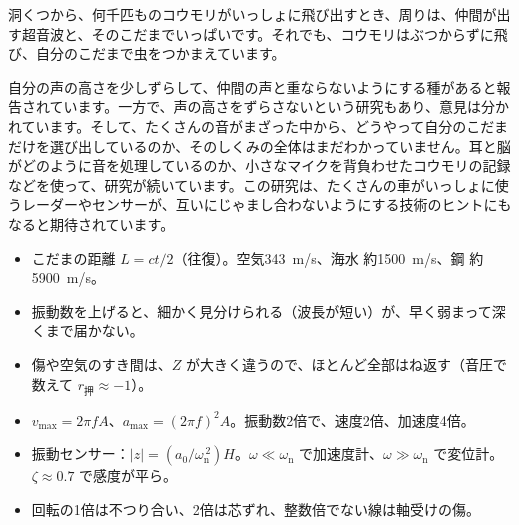 \begin{phmada}
洞くつから、何千匹ものコウモリがいっしょに飛び出すとき、周りは、仲間が出す超音波と、そのこだまでいっぱいです。それでも、コウモリはぶつからずに飛び、自分のこだまで虫をつかまえています。

自分の声の高さを少しずらして、仲間の声と重ならないようにする種があると報告されています。一方で、声の高さをずらさないという研究もあり、意見は分かれています。そして、たくさんの音がまざった中から、どうやって自分のこだまだけを選び出しているのか、そのしくみの全体はまだわかっていません。耳と脳がどのように音を処理しているのか、小さなマイクを背負わせたコウモリの記録などを使って、研究が続いています。この研究は、たくさんの車がいっしょに使うレーダーやセンサーが、互いにじゃまし合わないようにする技術のヒントにもなると期待されています。
\end{phmada}

\begin{taisetsu}
\begin{itemize}[leftmargin=1.2\zw, itemsep=2pt, topsep=0pt, label={\color{bkNavy}●}]
\item こだまの距離 $L=ct/2$（往復）。空気\qty{343}{m/s}、海水 約\qty{1500}{m/s}、鋼 約\qty{5900}{m/s}。
\item 振動数を上げると、細かく見分けられる（波長が短い）が、早く弱まって深くまで届かない。
\item 傷や空気のすき間は、$Z$ が大きく違うので、ほとんど全部はね返す（音圧で数えて $r_{\text{押}}\approx-1$）。
\item $v_{\max}=2\pi fA$、$a_{\max}=(2\pi f)^2A$。振動数2倍で、速度2倍、加速度4倍。
\item 振動センサー：$|z|=(a_0/\omega_{\mathrm n}^{\,2})H$。$\omega\ll\omega_{\mathrm n}$ で加速度計、$\omega\gg\omega_{\mathrm n}$ で変位計。$\zeta\approx0.7$ で感度が平ら。
\item 回転の1倍は不つり合い、2倍は芯ずれ、整数倍でない線は軸受けの傷。
\end{itemize}
\end{taisetsu}

\begin{kotoba}\small
{}
\end{kotoba}

